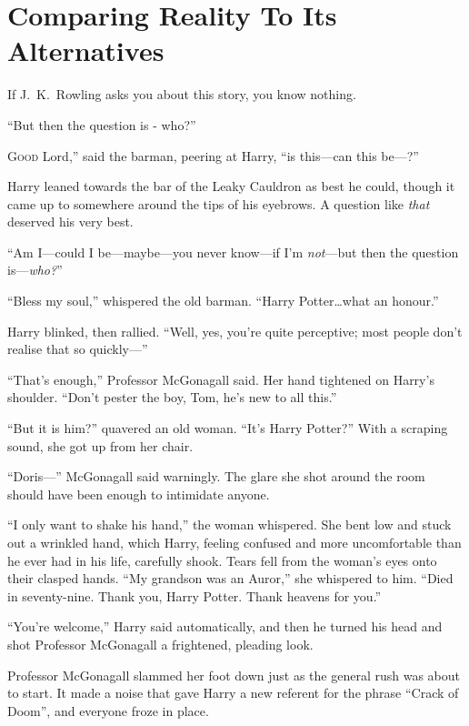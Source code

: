\chapter{Comparing Reality To Its Alternatives}

\begin{chapterOpeningAuthorNote}
    If J.~K.~Rowling asks you about this story, you know nothing.
\end{chapterOpeningAuthorNote}

\begin{chapterOpeningQuote}
    “But then the question is - who?”
\end{chapterOpeningQuote}

\lettrine[ante=“]{G}{ood} Lord,” said the barman, peering at Harry, “is this—can this be—?”

Harry leaned towards the bar of the Leaky Cauldron as best he could, though it came up to somewhere around the tips of his eyebrows. A question like \emph{that} deserved his very best.

“Am I—could I be—maybe—you never know—if I’m \emph{not}—but then the question is—\emph{who?}”

“Bless my soul,” whispered the old barman. “Harry Potter…what an honour.”

Harry blinked, then rallied. “Well, yes, you’re quite perceptive; most people don’t realise that so quickly—”

“That’s enough,” Professor McGonagall said. Her hand tightened on Harry’s shoulder. “Don’t pester the boy, Tom, he’s new to all this.”

“But it is him?” quavered an old woman. “It’s Harry Potter?” With a scraping sound, she got up from her chair.

“Doris—” McGonagall said warningly. The glare she shot around the room should have been enough to intimidate anyone.

“I only want to shake his hand,” the woman whispered. She bent low and stuck out a wrinkled hand, which Harry, feeling confused and more uncomfortable than he ever had in his life, carefully shook. Tears fell from the woman’s eyes onto their clasped hands. “My grandson was an Auror,” she whispered to him. “Died in seventy-nine. Thank you, Harry Potter. Thank heavens for you.”

“You’re welcome,” Harry said automatically, and then he turned his head and shot Professor McGonagall a frightened, pleading look.

Professor McGonagall slammed her foot down just as the general rush was about to start. It made a noise that gave Harry a new referent for the phrase “Crack of Doom”, and everyone froze in place.

